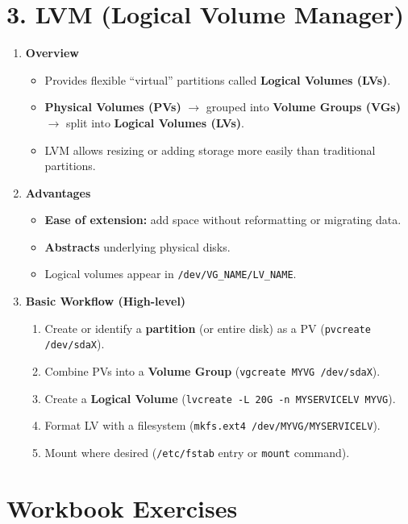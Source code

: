 \documentclass[12pt,a4paper]{report}
\begin{document}
\section*{3. LVM (Logical Volume Manager)}

\begin{enumerate}
    \item \textbf{Overview}
    \begin{itemize}
        \item Provides flexible “virtual” partitions called \textbf{Logical Volumes (LVs)}.
        \item \textbf{Physical Volumes (PVs)} $\to$ grouped into \textbf{Volume Groups (VGs)} $\to$ split into \textbf{Logical Volumes (LVs)}.
        \item LVM allows resizing or adding storage more easily than traditional partitions.
    \end{itemize}

    \item \textbf{Advantages}
    \begin{itemize}
        \item \textbf{Ease of extension:} add space without reformatting or migrating data.
        \item \textbf{Abstracts} underlying physical disks.
        \item Logical volumes appear in \texttt{/dev/VG\_NAME/LV\_NAME}.
    \end{itemize}

    \item \textbf{Basic Workflow (High-level)}
    \begin{enumerate}
        \item Create or identify a \textbf{partition} (or entire disk) as a PV (\texttt{pvcreate /dev/sdaX}).
        \item Combine PVs into a \textbf{Volume Group} (\texttt{vgcreate MYVG /dev/sdaX}).
        \item Create a \textbf{Logical Volume} (\texttt{lvcreate -L 20G -n MYSERVICELV MYVG}).
        \item Format LV with a filesystem (\texttt{mkfs.ext4 /dev/MYVG/MYSERVICELV}).
        \item Mount where desired (\texttt{/etc/fstab} entry or \texttt{mount} command).
    \end{enumerate}
\end{enumerate}

\section*{Workbook Exercises}
\end{document}
